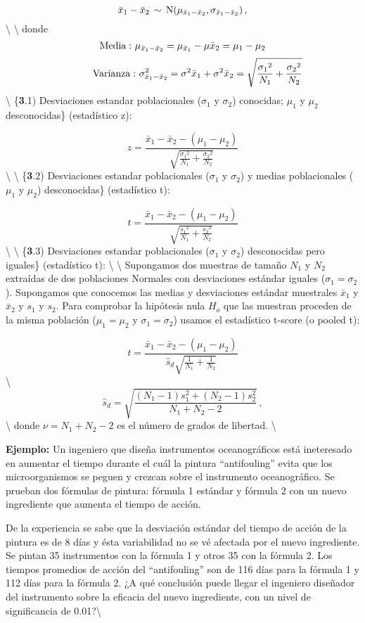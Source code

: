 \documentclass[
]{agujournal2019}
\begin{document}
\[\bar{x}_1-\bar{x}_2\,\sim\,{\rm N}(\mu_{\bar{x}_1-\bar{x}_2},\sigma_{\bar{x}_1-\bar{x}_2})\,,\]
\textbackslash{} \textbackslash{} donde
\[{\rm Media:}\,\,\mu_{\bar{x}_1-\bar{x}_2}=\mu_{\bar{x}_1}-\mu{\bar{x}_2}=\mu_1-\mu_2\]
\[\,\,\,\,\,\,\,\,\,\,\,\,\,\,\,\,\,\,{\rm Varianza:}\,\,\sigma^2_{\bar{x}_1-\bar{x}_2}=
   \sigma^2{\bar{x}_1}+\sigma^2{\bar{x}_2}=
   \sqrt{  \frac{{\sigma_1}^2}{N_1} + \frac{{\sigma_2}^2}{N_2} }\]
\textbackslash{} \{\textbf 3.1) Desviaciones estandar poblacionales
(\(\sigma_1\) y \(\sigma_2\)) conocidas; \(\mu_1\) y \(\mu_2\)
desconocidas\} (estadístico z):

\[z=\frac{\bar{x}_1-\bar{x}_2-(\mu_1-\mu_2)}
         {\sqrt{\frac{{\sigma_1}^2}{N_1}+\frac{{\sigma_2}^2}{N_2}}}\]
\textbackslash{} \textbackslash{} \{\textbf 3.2) Desviaciones estandar
poblacionales (\(\sigma_1\) y \(\sigma_2\)) y medias poblacionales
(\(\mu_1\) y \(\mu_2\)) desconocidas\} (estadístico t):

\[t=\frac{\bar{x}_1-\bar{x}_2-(\mu_1-\mu_2)}
              {\sqrt{\frac{{s_1}^2}{N_1}+\frac{{s_2}^2}{N_2}}}\]
\textbackslash{} \textbackslash{} \{\textbf 3.3) Desviaciones estandar
poblacionales (\(\sigma_1\) y \(\sigma_2\)) desconocidas pero iguales\}
(estadístico t): \textbackslash{} \textbackslash{} Supongamos dos
muestras de tamaño \(N_1\) y \(N_2\) extraídas de dos poblaciones
Normales con desviaciones estándar iguales (\(\sigma_1=\sigma_2\)).
Supongamos que conocemos las medias y desviaciones estándar muestrales
\(\bar{x}_1\) y \(\bar{x}_2\) y \(s_1\) y \(s_2\). Para comprobar la
hipótesis nula \(H_o\) que las muestran proceden de la misma población
(\(\mu_1=\mu_2\) y \(\sigma_1=\sigma_2\)) usamos el estadístico t-score
(o pooled t):

\[t=\frac{\bar{x}_1-\bar{x}_2-(\mu_1-\mu_2)}
         {\hat{s}_d\sqrt{\frac{1}{N_1}+\frac{1}{N_2}}}\]
\textbackslash{}
\[\hat{s}_d=\sqrt{\frac{(N_1-1)s^2_1 + (N_2-1)s^2_2}{N_1+N_2-2}}\,,\]
\textbackslash{} donde \(\nu=N_1+N_2-2\) es el número de grados de
libertad. \textbackslash{}

\noindent \textbf {Ejemplo:} Un ingeniero que diseña instrumentos
oceanográficos está ineteresado en aumentar el tiempo durante el cuál la
pintura ``antifouling'' evita que los microorganismos se peguen y
crezcan sobre el instrumento oceanográfico. Se prueban dos fórmulas de
pintura: fórmula 1 estándar y fórmula 2 con un nuevo ingrediente que
aumenta el tiempo de acción.

De la experiencia se sabe que la desviación estándar del tiempo de
acción de la pintura es de 8 días y ésta variabilidad no se vé afectada
por el nuevo ingrediente. Se pintan 35 instrumentos con la fórmula 1 y
otros 35 con la fórmula 2. Los tiempos promedios de acción del
``antifouling'' son de 116 días para la fórmula 1 y 112 días para la
fórmula 2. ¿A qué conclusión puede llegar el ingeniero diseñador del
instrumento sobre la eficacia del nuevo ingrediente, con un nivel de
significancia de 0.01?\textbackslash{}
\end{document}
